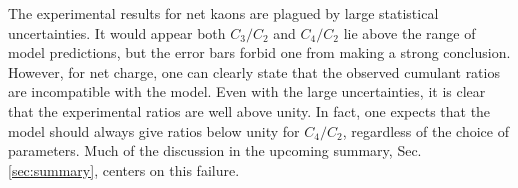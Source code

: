 The experimental results for net kaons are plagued by large statistical uncertainties. It would appear both $C_3/C_2$ and $C_4/C_2$ lie above the range of model predictions, but the error bars forbid one from making a strong conclusion. However, for net charge, one can clearly state that the observed cumulant ratios are incompatible with the model. Even with the large uncertainties, it is clear that the experimental ratios are well above unity. In fact, one expects that the model should always give ratios below unity for $C_4/C_2$, regardless of the choice of parameters. Much of the discussion in the upcoming summary, Sec. \ref{sec:summary}, centers on this failure.



